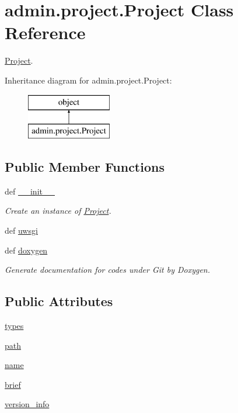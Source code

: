 \hypertarget{classadmin_1_1project_1_1Project}{\section{admin.\-project.\-Project Class Reference}
\label{classadmin_1_1project_1_1Project}
}


\hyperlink{classadmin_1_1project_1_1Project}{Project}.  


Inheritance diagram for admin.\-project.\-Project\-:\begin{figure}[H]
\begin{center}
\leavevmode
\includegraphics[height=2.000000cm]{d0/d08/classadmin_1_1project_1_1Project}
\end{center}
\end{figure}
\subsection*{Public Member Functions}
\begin{DoxyCompactItemize}
\item 
def \hyperlink{classadmin_1_1project_1_1Project_aeb44db1aabe1eae8b7d970702270dc61}{\-\_\-\-\_\-init\-\_\-\-\_\-}
\begin{DoxyCompactList}\small\item\em Create an instance of \hyperlink{classadmin_1_1project_1_1Project}{Project}. \end{DoxyCompactList}\item 
def \hyperlink{classadmin_1_1project_1_1Project_a83f54c8b5d69acab088d1cc1e6e52901}{uwsgi}
\item 
def \hyperlink{classadmin_1_1project_1_1Project_af8f058021d27f5d4f5c226afb10b4ada}{doxygen}
\begin{DoxyCompactList}\small\item\em Generate documentation for codes under Git by Doxygen. \end{DoxyCompactList}\end{DoxyCompactItemize}
\subsection*{Public Attributes}
\begin{DoxyCompactItemize}
\item 
\hyperlink{classadmin_1_1project_1_1Project_a59410622c6509fbb15e056da984ca5b1}{types}
\item 
\hyperlink{classadmin_1_1project_1_1Project_a4a925408cb4575a4f8e880918decdf7d}{path}
\item 
\hyperlink{classadmin_1_1project_1_1Project_a9b8c34b91f1ecdbbdcfea42e771dd6d6}{name}
\item 
\hyperlink{classadmin_1_1project_1_1Project_ac3e2b73e80631fe2171b8d4b236f2e53}{brief}
\item 
\hyperlink{classadmin_1_1project_1_1Project_aead4e47be18c6ddbfd19d3b5aab88bda}{version\-\_\-info}
\end{DoxyCompactItemize}
